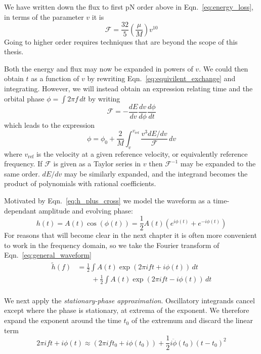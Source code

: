 We have written down the flux to first pN order above in
Eqn.~\ref{eq:energy_loss}, in terms of the parameter $v$ it is
%
\begin{equation}
\mathcal{F} = \frac{32}{5} \left( \frac{\mu}{M} \right) v^{10}
\end{equation}
%
Going to higher order requires techniques that are beyond the scope of
this thesis.

Both the energy and flux may now be expanded in powers of $v$.  We
could then obtain $t$ as a function of $v$ by rewriting
Eqn.~\ref{eq:equivilent_exchange} and integrating.  However, we
will instead obtain an expression relating time and the orbital phase
$\phi = \int 2\pi f\, dt$ by writing
%
\begin{equation*}
\mathcal{F} = - \frac{dE}{dv} \frac{dv}{d\phi} \frac{d\phi}{dt}
\end{equation*}
%
which leads to the expression
%
\begin{equation}
\label{eq:expansion_for_phi}
\phi = \phi_0 + \frac{2}{M} \int_v^{v_\mathrm{ref}} \frac{v^3
dE/dv}{\mathcal{F}}\, dv
\end{equation}
%
where $v_\mathrm{ref}$ is the velocity at a given reference velocity,
or equivalently reference frequency.  If $\mathcal{F}$ is given as a
Taylor series in $v$ then $\mathcal{F}^{-1}$ may be expanded to the
same order.  $dE/dv$ may be similarly expanded, and the integrand
becomes the product of polynomials with rational coefficients.

Motivated by Eqn.~\ref{eq:h_plus_cross} we model the waveform as a
time-dependant amplitude and evolving phase:
%
\begin{equation}
\label{eq:general_waveform}
h(t) = A(t) \cos(\phi(t)) = \frac{1}{2} A(t) \left(e^{i\phi(t)} +
e^{-i\phi(t)} \right)
\end{equation}
%
For reasons that will become clear in the next chapter it is often more
convenient to work in the frequency domain, so we take the Fourier
transform of Eqn.~\ref{eq:general_waveform}
%
\begin{align}
\tilde{h}(f) &= \frac{1}{2} \int A(t) \exp(2\pi i f t + i
\phi(t))\, dt \\ \nonumber
&\qquad + \frac{1}{2} \int A(t) \exp(2\pi i f t - i
\phi(t))\, dt \\ \nonumber
\end{align}

We next apply the \emph{stationary-phase approximation}.  Oscillatory
integrands cancel except where the phase is stationary, at extrema of
the exponent.  We therefore expand the exponent around the time $t_0$
of the extremum and discard the linear term
%
\begin{equation}
2 \pi i f t + i \phi(t) \approx (2 \pi i f t_0 + i \phi(t_0))
+ \frac{1}{2} i \ddot{\phi}(t_0) (t-t_0)^2
\end{equation}

